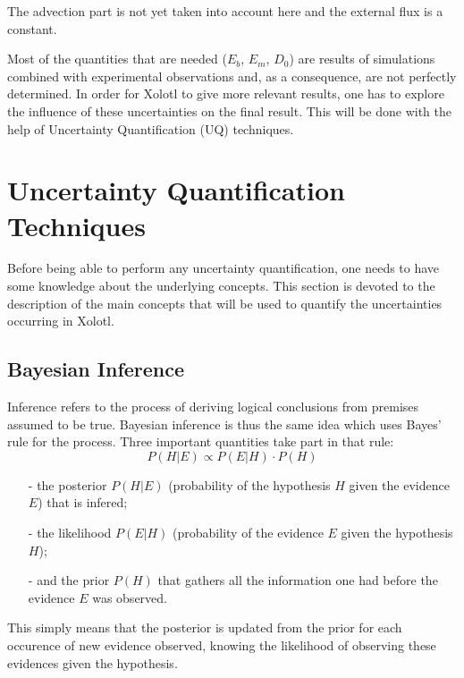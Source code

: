 \documentclass{article}
\begin{document}
The advection part is not yet taken into account here and the external flux is
a constant. \newline

Most of the quantities that are needed ($E_b$, $E_m$, $D_0$) are results of
simulations combined with experimental observations and, as a consequence, are
not perfectly determined. In order for Xolotl to give more relevant results, one
has to explore the influence of these uncertainties on the final result. This
will be done with the help of Uncertainty Quantification (UQ) techniques.

\section{Uncertainty Quantification Techniques}

Before being able to perform any uncertainty quantification, one needs to have
some knowledge about the underlying concepts. This section is devoted to the
description of the main concepts that will be used to quantify the
uncertainties occurring in Xolotl.

\subsection{Bayesian Inference}

Inference refers to the process of deriving logical conclusions from premises
assumed to be true. Bayesian inference is thus the same idea which uses Bayes'
rule for the process. Three important quantities take part in that rule:
\begin{equation}
	P(H|E) \propto P(E|H) \cdot P(H)
\end{equation}

\begin{itemize}
  	\itemsep0em
  	\item[-] the posterior $P(H|E)$ (probability of the hypothesis $H$ given the
  	evidence $E$) that is infered;
  	\item[-] the likelihood $P(E|H)$ (probability of the evidence $E$ given the
  	hypothesis $H$);
  	\item[-] and the prior $P(H)$ that gathers all the information one had before
  	the evidence $E$ was observed.
\end{itemize}

This simply means that the posterior is updated from the prior for each
occurence of new evidence observed, knowing the likelihood of observing
these evidences given the hypothesis. \newline
\end{document}
